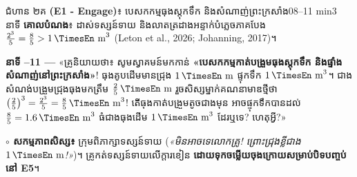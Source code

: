 \documentclass[a4paper,12pt]{article}
\newcommand{\en}[1]{{\TimesEn #1}}
\newcommand{\enbf}[1]{{\TimesEn\textbf{#1}}}
\newcommand{\unit}[1]{\,\text{\en{#1}}}
\newcommand{\teachersays}[1]{{\muol\fontsize{10.8pt}{17pt}\selectfont «គ្រូនិយាយថា៖} #1»}
\begin{document}
\Needspace{2.0cm}
\begin{phasebox}{ជំហាន ២គ \enbf{(E1 - Engage)}៖ បេសកកម្មធុងស្តុកទឹក និងសំណាញ់ព្រះក្រសាំង}{08--11 min}{3 នាទី}
\textbf{គោលបំណង}៖ ដាស់ទស្សន៍ទាយ និងលាតត្រដាងអន្ទាក់បំភ្លេចភាគបែង $\frac{2^3}{5}=\frac{8}{5}>1\unit{m}^3$ \en{(Leton et al., 2026; Johanning, 2017)}។
\end{phasebox}
\begin{scriptbox}
  \textbf{នាទី \en{08--11} — }\teachersays{សូមស្វាគមន៍មកកាន់ \textbf{«បេសកកម្មកាត់បង្រួមធុងស្តុកទឹក និងផ្ទាំងសំណាញ់នៅព្រះក្រសាំង»}! ធុងគូបដើមមានជ្រុង $1\unit{m}$ ផ្ទុកទឹក $1\unit{m}^3$។ ជាងសំណង់បង្រួមជ្រុងធុងមកត្រឹម $\frac{2}{5}\unit{m}$ រួចសិស្សម្នាក់គណនាមាឌថ្មីថា $\left(\frac{2}{5}\right)^3 = \frac{2^3}{5} = \frac{8}{5}\unit{m}^3$! តើធុងកាត់បង្រួមតូចជាងមុន អាចផ្ទុកទឹកបានដល់ $\frac{8}{5}=1.6\unit{m}^3$ ធំជាងធុងដើម $1\unit{m}^3$ ដែរឬទេ? ហេតុអ្វី?}\par\vspace{2pt}
  \textbf{$\circ$ សកម្មភាពសិស្ស៖} ក្រុមពិភាក្សាទស្សន៍ទាយ (\textit{«មិនអាចទេលោកគ្រូ! ព្រោះជ្រុងខ្លីជាង $1\unit{m}$!»})។ គ្រូកត់ទស្សន៍ទាយលើក្ដារខៀន \textbf{ដោយទុកចម្លើយចុងក្រោយសម្រាប់បិទបញ្ចប់នៅ \en{E5}}។
\end{scriptbox}
\end{document}
